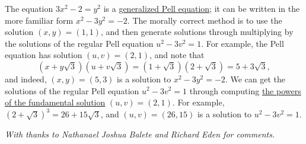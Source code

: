 \documentclass[11pt,paper=letter]{scrartcl}
\newenvironment{rem}%
{\noindent \ignorespaces \small \sffamily \sansmath {\bfseries Remark.}}%
{\ignorespacesafterend}
\begin{document}
\begin{enumerate}[align=left,leftmargin=*,resume]
\begin{rem}
The equation $3x^2 - 2 = y^2$ is a \href{https://en.wikipedia.org/wiki/Pell%27s_equation#Generalized_Pell's_equation}{generalized Pell equation}; it can be written in the more familiar form $x^2 - 3y^2 = -2$. The morally correct method is to use the solution $(x, y) = (1, 1)$, and then generate solutions through multiplying by the solutions of the regular Pell equation $u^2 - 3v^2 = 1$. For example, the Pell equation has solution $(u, v) = (2, 1)$, and note that \[
  \left(x + y\sqrt{3}\right)\left(u + v\sqrt{3}\right)
  = (1 + \sqrt{3})(2 + \sqrt{3})
  = 5 + 3\sqrt{3},
\]
and indeed, $(x, y) = (5, 3)$ is a solution to $x^2 - 3y^2 = -2$. We can get the solutions of the regular Pell equation $u^2 - 3v^2 = 1$ through computing \href{https://en.wikipedia.org/wiki/Pell%27s_equation#Additional_solutions_from_the_fundamental_solution}{the powers of the fundamental solution} $(u, v) = (2, 1)$. For example, $(2 + \sqrt{3})^3 = 26 + 15\sqrt{3}$, and $(u, v) = (26, 15)$ is a solution to $u^2 - 3v^2 = 1$. 
\end{rem}

\end{enumerate}

\emph{With thanks to Nathanael Joshua Balete and Richard Eden for comments.}
\end{document}
